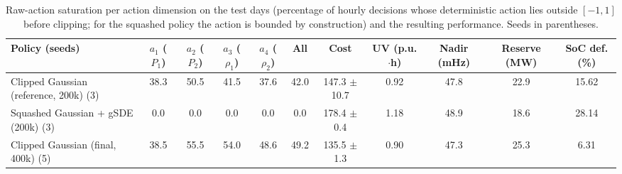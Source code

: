 \begin{table}[!t]
\caption{Raw-action saturation per action dimension on the test days (percentage of hourly decisions whose deterministic action lies outside $[-1,1]$ before clipping; for the squashed policy the action is bounded by construction) and the resulting performance. Seeds in parentheses.}
\label{tab:clip}
\centering
\scriptsize
\setlength{\tabcolsep}{3pt}
\begin{tabular}{lcccccccccc}
\toprule
\textbf{Policy (seeds)} & $a_1$ ($P_1$) & $a_2$ ($P_2$) & $a_3$ ($\rho_1$) & $a_4$ ($\rho_2$) & \textbf{All} & \textbf{Cost} & \textbf{UV (p.u.$\cdot$h)} & \textbf{Nadir (mHz)} & \textbf{Reserve (MW)} & \textbf{SoC def. (\%)}\\
\midrule
Clipped Gaussian (reference, 200k) (3) & 38.3 & 50.5 & 41.5 & 37.6 & 42.0 & 147.3 $\pm$ 10.7 & 0.92 & 47.8 & 22.9 & 15.62 \\
Squashed Gaussian + gSDE (200k) (3) & 0.0 & 0.0 & 0.0 & 0.0 & 0.0 & 178.4 $\pm$ 0.4 & 1.18 & 48.9 & 18.6 & 28.14 \\
Clipped Gaussian (final, 400k) (5) & 38.5 & 55.5 & 54.0 & 48.6 & 49.2 & 135.5 $\pm$ 1.3 & 0.90 & 47.3 & 25.3 & 6.31 \\
\bottomrule
\end{tabular}
\end{table}
